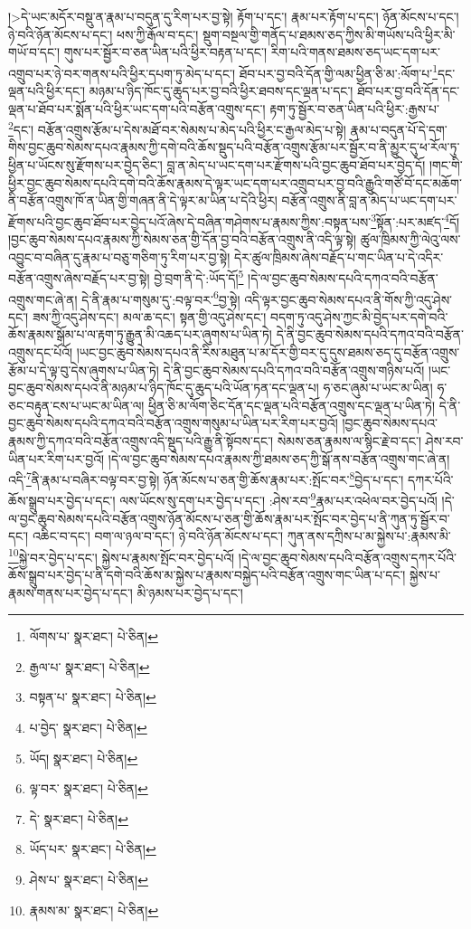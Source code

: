  །>དེ་ཡང་མདོར་བསྡུ་ན་རྣམ་པ་བདུན་དུ་རིག་པར་བྱ་སྟེ། རྟོག་པ་དང་། རྣམ་པར་རྟོག་པ་དང་། ཉོན་མོངས་པ་དང་། ཉེ་བའི་ཉོན་མོངས་པ་དང་། ཕས་ཀྱི་རྒོལ་བ་དང་། སྡུག་བསྔལ་གྱི་གནོད་པ་ཐམས་ཅད་ཀྱིས་མི་གཡོས་པའི་ཕྱིར་མི་གཡོ་བ་དང་། གུས་པར་སྦྱོར་བ་ཅན་ཡིན་པའི་ཕྱིར་བརྟན་པ་དང་། རིག་པའི་གནས་ཐམས་ཅད་ཡང་དག་པར་འགྲུབ་པར་ཉེ་བར་གནས་པའི་ཕྱིར་དཔག་ཏུ་མེད་པ་དང་། ཐོབ་པར་བྱ་བའི་དོན་གྱི་ལམ་ཕྱིན་ཅི་མ་:ལོག་པ་\footnote{ལོགས་པ་  སྣར་ཐང་།  པེ་ཅིན། }དང་ལྡན་པའི་ཕྱིར་དང་། མཉམ་པ་ཉིད་ཁོང་དུ་ཆུད་པར་བྱ་བའི་ཕྱིར་ཐབས་དང་ལྡན་པ་དང་། ཐོབ་པར་བྱ་བའི་དོན་དང་ལྡན་པ་ཐོབ་པར་སྨོན་པའི་ཕྱིར་ཡང་དག་པའི་བརྩོན་འགྲུས་དང་། རྟག་ཏུ་སྦྱོར་བ་ཅན་ཡིན་པའི་ཕྱིར་:རྒྱས་པ་\footnote{རྒྱལ་པ་  སྣར་ཐང་།  པེ་ཅིན། }དང་། བརྩོན་འགྲུས་རྩོམ་པ་དེས་མཐོ་བར་སེམས་པ་མེད་པའི་ཕྱིར་ང་རྒྱལ་མེད་པ་སྟེ། རྣམ་པ་བདུན་པོ་དེ་དག་གིས་བྱང་ཆུབ་སེམས་དཔའ་རྣམས་ཀྱི་དགེ་བའི་ཆོས་སྡུད་པའི་བརྩོན་འགྲུས་རྩོམ་པར་སྦྱོར་བ་ནི་མྱུར་དུ་ཕ་རོལ་ཏུ་ཕྱིན་པ་ཡོངས་སུ་རྫོགས་པར་བྱེད་ཅིང་། བླ་ན་མེད་པ་ཡང་དག་པར་རྫོགས་པའི་བྱང་ཆུབ་ཐོབ་པར་བྱེད་དོ། །གང་གི་ཕྱིར་བྱང་ཆུབ་སེམས་དཔའི་དགེ་བའི་ཆོས་རྣམས་དེ་ལྟར་ཡང་དག་པར་འགྲུབ་པར་བྱ་བའི་རྒྱུའི་གཙོ་བོ་དང་མཆོག་ནི་བརྩོན་འགྲུས་ཁོ་ན་ཡིན་གྱི་གཞན་ནི་དེ་ལྟར་མ་ཡིན་པ་དེའི་ཕྱིར། བརྩོན་འགྲུས་ནི་བླ་ན་མེད་པ་ཡང་དག་པར་རྫོགས་པའི་བྱང་ཆུབ་ཐོབ་པར་བྱེད་པའོ་ཞེས་དེ་བཞིན་གཤེགས་པ་རྣམས་ཀྱིས་:བསྟན་པས་\footnote{བསྟན་པ་  སྣར་ཐང་།  པེ་ཅིན། }སྟོན་:པར་མཛད་\footnote{པ་བྱེད་  སྣར་ཐང་།  པེ་ཅིན། }དོ། །བྱང་ཆུབ་སེམས་དཔའ་རྣམས་ཀྱི་སེམས་ཅན་གྱི་དོན་བྱ་བའི་བརྩོན་འགྲུས་ནི་འདི་ལྟ་སྟེ། ཚུལ་ཁྲིམས་ཀྱི་ལེའུ་ལས་འབྱུང་བ་བཞིན་དུ་རྣམ་པ་བཅུ་གཅིག་ཏུ་རིག་པར་བྱ་སྟེ། དེར་ཚུལ་ཁྲིམས་ཞེས་བརྗོད་པ་གང་ཡིན་པ་དེ་འདིར་བརྩོན་འགྲུས་ཞེས་བརྗོད་པར་བྱ་སྟེ། བྱེ་བྲག་ནི་དེ་:ཡོད་དོ།\footnote{ཡོད།  སྣར་ཐང་།  པེ་ཅིན། } །དེ་ལ་བྱང་ཆུབ་སེམས་དཔའི་དཀའ་བའི་བརྩོན་འགྲུས་གང་ཞེ་ན། དེ་ནི་རྣམ་པ་གསུམ་དུ་:བལྟ་བར་\footnote{ལྟ་བར་  སྣར་ཐང་།  པེ་ཅིན། }བྱ་སྟེ། འདི་ལྟར་བྱང་ཆུབ་སེམས་དཔའ་ནི་གོས་ཀྱི་འདུ་ཤེས་དང་། ཟས་ཀྱི་འདུ་ཤེས་དང་། མལ་ཆ་དང་། སྟན་གྱི་འདུ་ཤེས་དང་། བདག་ཏུ་འདུ་ཤེས་ཀྱང་མི་བྱེད་པར་དགེ་བའི་ཆོས་རྣམས་སྒོམ་པ་ལ་རྟག་ཏུ་རྒྱུན་མི་འཆད་པར་ཞུགས་པ་ཡིན་ཏེ། དེ་ནི་བྱང་ཆུབ་སེམས་དཔའི་དཀའ་བའི་བརྩོན་འགྲུས་དང་པོའོ། །ཡང་བྱང་ཆུབ་སེམས་དཔའ་ནི་རིས་མཐུན་པ་མ་དོར་གྱི་བར་དུ་དུས་ཐམས་ཅད་དུ་བརྩོན་འགྲུས་རྩོམ་པ་དེ་ལྟ་བུ་དེས་ཞུགས་པ་ཡིན་ཏེ། དེ་ནི་བྱང་ཆུབ་སེམས་དཔའི་དཀའ་བའི་བརྩོན་འགྲུས་གཉིས་པའོ། །ཡང་བྱང་ཆུབ་སེམས་དཔའ་ནི་མཉམ་པ་ཉིད་ཁོང་དུ་ཆུད་པའི་ཡོན་ཏན་དང་ལྡན་པ། ཧ་ཅང་ཞུམ་པ་ཡང་མ་ཡིན། ཧ་ཅང་བརྟུན་ངས་པ་ཡང་མ་ཡིན་ལ། ཕྱིན་ཅི་མ་ལོག་ཅིང་དོན་དང་ལྡན་པའི་བརྩོན་འགྲུས་དང་ལྡན་པ་ཡིན་ཏེ། དེ་ནི་བྱང་ཆུབ་སེམས་དཔའི་དཀའ་བའི་བརྩོན་འགྲུས་གསུམ་པ་ཡིན་པར་རིག་པར་བྱའོ། །བྱང་ཆུབ་སེམས་དཔའ་རྣམས་ཀྱི་དཀའ་བའི་བརྩོན་འགྲུས་འདི་སྡུད་པའི་རྒྱུ་ནི་སྟོབས་དང་། སེམས་ཅན་རྣམས་ལ་སྙིང་རྗེ་བ་དང་། ཤེས་རབ་ཡིན་པར་རིག་པར་བྱའོ། །དེ་ལ་བྱང་ཆུབ་སེམས་དཔའ་རྣམས་ཀྱི་ཐམས་ཅད་ཀྱི་སྒོ་ནས་བརྩོན་འགྲུས་གང་ཞེ་ན། འདི་\footnote{དེ་  སྣར་ཐང་།  པེ་ཅིན། }ནི་རྣམ་པ་བཞིར་བལྟ་བར་བྱ་སྟེ། ཉོན་མོངས་པ་ཅན་གྱི་ཆོས་རྣམ་པར་:སྤོང་བར་\footnote{ཡོད་པར་  སྣར་ཐང་།  པེ་ཅིན། }བྱེད་པ་དང་། དཀར་པོའི་ཆོས་སྒྲུབ་པར་བྱེད་པ་དང་། ལས་ཡོངས་སུ་དག་པར་བྱེད་པ་དང་། :ཤེས་རབ་\footnote{ཤེས་པ་  སྣར་ཐང་།  པེ་ཅིན། }རྣམ་པར་འཕེལ་བར་བྱེད་པའོ། །དེ་ལ་བྱང་ཆུབ་སེམས་དཔའི་བརྩོན་འགྲུས་ཉོན་མོངས་པ་ཅན་གྱི་ཆོས་རྣམ་པར་སྤོང་བར་བྱེད་པ་ནི་ཀུན་ཏུ་སྦྱོར་བ་དང་། འཆིང་བ་དང་། བག་ལ་ཉལ་བ་དང་། ཉེ་བའི་ཉོན་མོངས་པ་དང་། ཀུན་ནས་དཀྲིས་པ་མ་སྐྱེས་པ་:རྣམས་མི་\footnote{རྣམས་མ་  སྣར་ཐང་།  པེ་ཅིན། }སྐྱེ་བར་བྱེད་པ་དང་། སྐྱེས་པ་རྣམས་སྤོང་བར་བྱེད་པའོ། །དེ་ལ་བྱང་ཆུབ་སེམས་དཔའི་བརྩོན་འགྲུས་དཀར་པོའི་ཆོས་སྒྲུབ་པར་བྱེད་པ་ནི་དགེ་བའི་ཆོས་མ་སྐྱེས་པ་རྣམས་བསྐྱེད་པའི་བརྩོན་འགྲུས་གང་ཡིན་པ་དང་། སྐྱེས་པ་རྣམས་གནས་པར་བྱེད་པ་དང་། མི་ཉམས་པར་བྱེད་པ་དང་། 